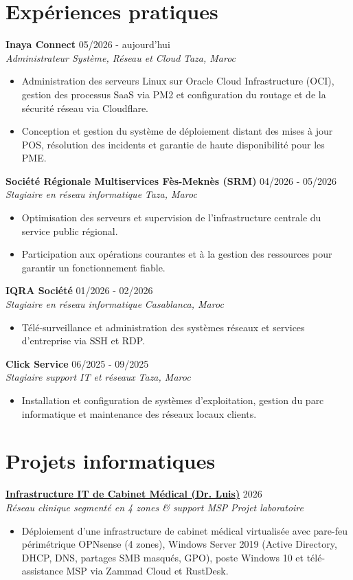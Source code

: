 \documentclass[10pt,a4paper]{article}
\newcommand{\cvheading}[4]{
  \textbf{#1} \hfill #2 \\[0.08em]
  \textit{#3} \hfill \textit{#4}
}
\newcommand{\cvheadinglink}[5]{
  \textbf{\href{#5}{#1}} \hfill #2 \\[0.08em]
  \textit{#3} \hfill \textit{#4}
}
\begin{document}
\section*{Expériences pratiques}
\cvheading{Inaya Connect}{05/2026 - aujourd'hui}{Administrateur Système, Réseau et Cloud}{Taza, Maroc}
\begin{itemize}
  \item Administration des serveurs Linux sur Oracle Cloud Infrastructure (OCI), gestion des processus SaaS via PM2 et configuration du routage et de la sécurité réseau via Cloudflare.
  \item Conception et gestion du système de déploiement distant des mises à jour POS, résolution des incidents et garantie de haute disponibilité pour les PME.
\end{itemize}

\cvheading{Société Régionale Multiservices Fès-Meknès (SRM)}{04/2026 - 05/2026}{Stagiaire en réseau informatique}{Taza, Maroc}
\begin{itemize}
  \item Optimisation des serveurs et supervision de l'infrastructure centrale du service public régional.
  \item Participation aux opérations courantes et à la gestion des ressources pour garantir un fonctionnement fiable.
\end{itemize}

\cvheading{IQRA Société}{01/2026 - 02/2026}{Stagiaire en réseau informatique}{Casablanca, Maroc}
\begin{itemize}
  \item Télé-surveillance et administration des systèmes réseaux et services d'entreprise via SSH et RDP.
\end{itemize}

\cvheading{Click Service}{06/2025 - 09/2025}{Stagiaire support IT et réseaux}{Taza, Maroc}
\begin{itemize}
  \item Installation et configuration de systèmes d'exploitation, gestion du parc informatique et maintenance des réseaux locaux clients.
\end{itemize}

\section*{Projets informatiques}
\cvheadinglink{Infrastructure IT de Cabinet Médical (Dr. Luis)}{2026}{Réseau clinique segmenté en 4 zones \& support MSP}{Projet laboratoire}{https://grydsh.dev/fr/dental-clinic.html}
\begin{itemize}
  \item Déploiement d'une infrastructure de cabinet médical virtualisée avec pare-feu périmétrique OPNsense (4 zones), Windows Server 2019 (Active Directory, DHCP, DNS, partages SMB masqués, GPO), poste Windows 10 et télé-assistance MSP via Zammad Cloud et RustDesk.
\end{itemize}
\end{document}
